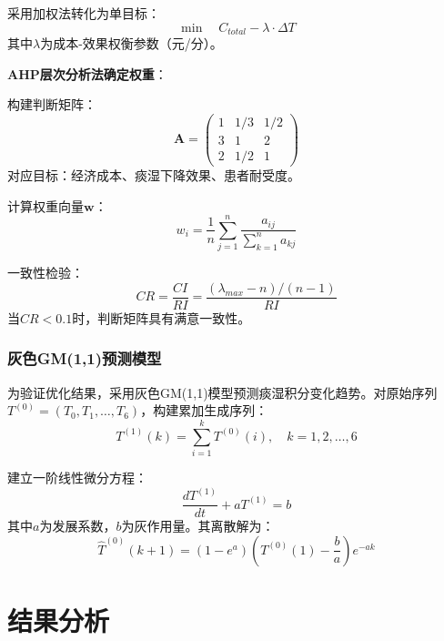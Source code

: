 \documentclass[12pt,a4paper]{ctexart}
\begin{document}
采用加权法转化为单目标：
\begin{equation}
    \min \quad C_{total} - \lambda \cdot \Delta T
\end{equation}
其中$\lambda$为成本-效果权衡参数（元/分）。

\textbf{AHP层次分析法确定权重}：

构建判断矩阵：
\begin{equation}
    \mathbf{A} = \begin{pmatrix}
        1 & 1/3 & 1/2 \\
        3 & 1 & 2 \\
        2 & 1/2 & 1
    \end{pmatrix}
\end{equation}
对应目标：经济成本、痰湿下降效果、患者耐受度。

计算权重向量$\mathbf{w}$：
\begin{equation}
    w_i = \frac{1}{n}\sum_{j=1}^{n}\frac{a_{ij}}{\sum_{k=1}^{n}a_{kj}}
\end{equation}

一致性检验：
\begin{equation}
    CR = \frac{CI}{RI} = \frac{(\lambda_{max} - n)/(n-1)}{RI}
\end{equation}
当$CR < 0.1$时，判断矩阵具有满意一致性。

\subsubsection{灰色GM(1,1)预测模型}

为验证优化结果，采用灰色GM(1,1)模型预测痰湿积分变化趋势。对原始序列$T^{(0)} = (T_0, T_1, \dots, T_6)$，构建累加生成序列：
\begin{equation}
    T^{(1)}(k) = \sum_{i=1}^{k}T^{(0)}(i), \quad k=1,2,\dots,6
\end{equation}

建立一阶线性微分方程：
\begin{equation}
    \frac{dT^{(1)}}{dt} + aT^{(1)} = b
\end{equation}
其中$a$为发展系数，$b$为灰作用量。其离散解为：
\begin{equation}
    \hat{T}^{(0)}(k+1) = (1-e^a)\left(T^{(0)}(1)-\frac{b}{a}\right)e^{-ak}
\end{equation}

\newpage
\section{结果分析}
\end{document}
